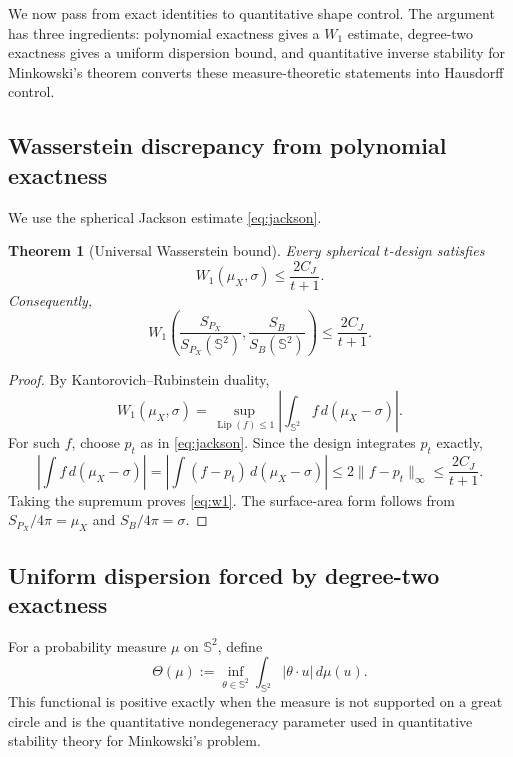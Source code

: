 \documentclass[11pt]{article}
\newtheorem{theorem}{Theorem}[section]
\theoremstyle{definition}
\theoremstyle{remark}
\newcommand{\Sph}{\mathbb S}
\newcommand{\Lip}{\operatorname{Lip}}
\begin{document}
We now pass from exact identities to quantitative shape control. The argument has three ingredients: polynomial exactness gives a $W_1$ estimate, degree-two exactness gives a uniform dispersion bound, and quantitative inverse stability for Minkowski's theorem converts these measure-theoretic statements into Hausdorff control.

\subsection{Wasserstein discrepancy from polynomial exactness}
We use the spherical Jackson estimate \eqref{eq:jackson}.

\begin{theorem}[Universal Wasserstein bound]\label{thm:w1}
Every spherical $t$-design satisfies
\begin{equation}\label{eq:w1}
W_1(\mu_X,\sigma)\le\frac{2C_J}{t+1}.
\end{equation}
Consequently,
\begin{equation}\label{eq:w1-surface}
W_1\!\left(\frac{S_{P_X}}{S_{P_X}(\Sph^2)},\frac{S_B}{S_B(\Sph^2)}\right)
\le\frac{2C_J}{t+1}.
\end{equation}
\end{theorem}

\begin{proof}
By Kantorovich--Rubinstein duality,
\[
W_1(\mu_X,\sigma)
=\sup_{\Lip(f)\le1}\left|\int_{\Sph^2}f\,d(\mu_X-\sigma)\right|.
\]
For such $f$, choose $p_t$ as in \eqref{eq:jackson}. Since the design integrates $p_t$ exactly,
\[
\left|\int f\,d(\mu_X-\sigma)\right|
=\left|\int(f-p_t)\,d(\mu_X-\sigma)\right|
\le2\|f-p_t\|_\infty
\le\frac{2C_J}{t+1}.
\]
Taking the supremum proves \eqref{eq:w1}. The surface-area form follows from $S_{P_X}/4\pi=\mu_X$ and $S_B/4\pi=\sigma$.
\end{proof}

\subsection{Uniform dispersion forced by degree-two exactness}
For a probability measure $\mu$ on $\Sph^2$, define
\begin{equation}\label{eq:theta}
\Theta(\mu):=\inf_{\theta\in\Sph^2}\int_{\Sph^2}|\theta\cdot u|\,d\mu(u).
\end{equation}
This functional is positive exactly when the measure is not supported on a great circle and is the quantitative nondegeneracy parameter used in quantitative stability theory for Minkowski's problem.
\end{document}
